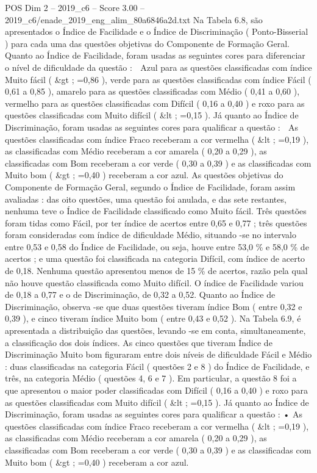 \begin{textsample}{POS Dim 2 – 2019\_c6 – Score 3.00 – 2019\_c6/enade\_2019\_eng\_alim\_80a6846a2d.txt}
Na Tabela 6.8, são apresentados o Índice de Facilidade e o Índice de Discriminação ( Ponto-Bisserial ) para cada uma das questões objetivas do Componente de Formação Geral.
Quanto ao Índice de Facilidade, foram usadas as seguintes cores para diferenciar o nível de dificuldade da questão :  Azul para as questões classificadas com índice Muito fácil ( \&gt ; =0,86 ), verde para as questões classificadas com índice Fácil ( 0,61 a 0,85 ), amarelo para as questões classificadas com Médio ( 0,41 a 0,60 ), vermelho para as questões classificadas com Difícil ( 0,16 a 0,40 ) e roxo para as questões classificadas com Muito difícil ( \&lt ; =0,15 ).
Já quanto ao Índice de Discriminação, foram usadas as seguintes cores para qualificar a questão :  As questões classificadas com índice Fraco receberam a cor vermelha ( \&lt ; =0,19 ), as classificadas com Médio receberam a cor amarela ( 0,20 a 0,29 ), as classificadas com Bom receberam a cor verde ( 0,30 a 0,39 ) e as classificadas com Muito bom ( \&gt ; =0,40 ) receberam a cor azul.
As questões objetivas do Componente de Formação Geral, segundo o Índice de Facilidade, foram assim avaliadas : das oito questões, uma questão foi anulada, e das sete restantes, nenhuma teve o Índice de Facilidade classificado como Muito fácil.
Três questões foram tidas como Fácil, por ter índice de acertos entre 0,65 e 0,77 ; três questões foram consideradas com índice de dificuldade Médio, situando -se no intervalo entre 0,53 e 0,58 do Índice de Facilidade, ou seja, houve entre 53,0 \% e 58,0 \% de acertos ; e uma questão foi classificada na categoria Difícil, com índice de acerto de 0,18.
Nenhuma questão apresentou menos de 15 \% de acertos, razão pela qual não houve questão classificada como Muito difícil.
O índice de Facilidade variou de 0,18 a 0,77 e o de Discriminação, de 0,32 a 0,52.
Quanto ao Índice de Discriminação, observa -se que duas questões tiveram índice Bom ( entre 0,32 e 0,39 ), e cinco tiveram índice Muito bom ( entre 0,43 e 0,52 ).
Na Tabela 6.9, é apresentada a distribuição das questões, levando -se em conta, simultaneamente, a classificação dos dois índices.
As cinco questões que tiveram Índice de Discriminação Muito bom figuraram entre dois níveis de dificuldade Fácil e Médio : duas classificadas na categoria Fácil ( questões 2 e 8 ) do Índice de Facilidade, e três, na categoria Médio ( questões 4, 6 e 7 ).
Em particular, a questão 8 foi a que apresentou o maior poder classificadas com Difícil ( 0,16 a 0,40 ) e roxo para as questões classificadas com Muito difícil ( \&lt ; =0,15 ).
Já quanto ao Índice de Discriminação, foram usadas as seguintes cores para qualificar a questão : • As questões classificadas com índice Fraco receberam a cor vermelha ( \&lt ; =0,19 ), as classificadas com Médio receberam a cor amarela ( 0,20 a 0,29 ), as classificadas com Bom receberam a cor verde ( 0,30 a 0,39 ) e as classificadas com Muito bom ( \&gt ; =0,40 ) receberam a cor azul.

\end{textsample}
